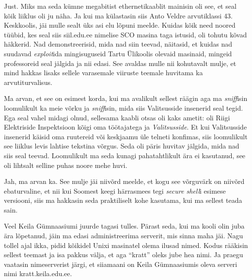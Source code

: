
Just. Miks ma seda kümne megabitist ethernetikaablit mainisin oli see, et seal 
kõik liiklus oli ju näha. Ja kui ma külastasin siis Anto 
Veldre arvutiklassi 43. 
Keskkoolis,  jäi mulle sealt üks asi elu 
lõpuni meelde. Kuidas kõik need noored tüübid, kes seal siis 
siil.edu.ee nimelise SCO masina 
taga istusid, oli tohutu kõvad häkkerid. Nad demonstreerisid, mida nad siin 
teevad, näitasid, et kuidas nad  suudavad \emph{exploit}ida mingisuguseid Tartu 
Ülikoolis olevaid masinaid, mingeid professoreid seal jälgida ja nii edasi. See 
avaldas mulle nii kohutavalt mulje, et mind hakkas lisaks sellele varasemale 
viiruste teemale huvitama ka arvutiturvalisus.

Ma arvan, et see on esimest korda, kui ma avalikult sellest räägin aga ma 
\emph{sniff}isin loomulikult ka meie  võrku ja \emph{sniff}isin, mida siis 
Valitsusside insenerid seal tegid. Ega seal vahel midagi 
olnud,  sellesama  kaabli otsas oli kaks ametit: oli Riigi Elektriside 
Inspektsioon kõigi oma töötajatega ja 
\emph{Valitsusside}. Et kui Valitsusside insenerid käisid oma ruutereid või 
keskjaamu üle telneti konfimas, siis loomulikult see liiklus levis lahtise 
tekstina võrgus. Seda oli päris huvitav jälgida, mida nad siis seal teevad.  
Loomulikult ma seda kunagi pahatahtlikult ära ei kasutanud, see oli lihtsalt 
selline puhas  noore mehe huvi.


Jah, ma arvan ka. See mulje jäi niivõrd meelde, et kogu see võrguvärk on 
niivõrd ebaturvaline, et nii kui Soomest keegi härrasmees tegi 
\emph{secure shell}i esimese versiooni, siis ma hakkasin seda praktiliselt kohe 
kasutama, kui ma sellest teada sain. 

Veel Keila Gümnaasiumi juurde tagasi tulles. 
Pärast seda, kui ma kooli olin juba ära lõpetanud,  jäin ma edasi 
administreerima serverit, mis sinna maha jäi. Nagu tollel ajal ikka,  pidid 
kõikidel Unixi masinatel  olema ilusad nimed. Kodus rääkisin sellest teemast ja 
isa pakkus välja, et aga \enquote{kratt} oleks jube hea nimi. Ja praegu 
vaatasin nimeserverist järgi, et siiamaani on Keila Gümnaasiumis oleva serveri 
nimi kratt.keila.edu.ee.

